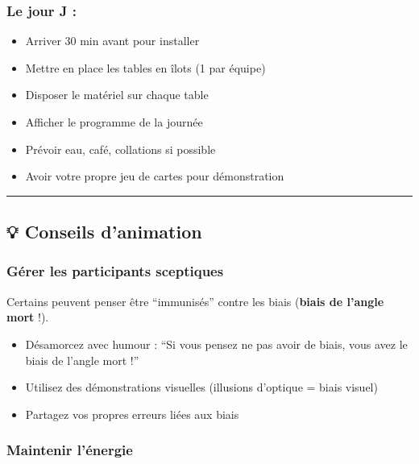 \documentclass[
]{article}
\providecommand{\tightlist}{%
  \setlength{\itemsep}{0pt}\setlength{\parskip}{0pt}}
\begin{document}
\subsubsection{\texorpdfstring{\textbf{Le jour J
:}}{Le jour J :}}\label{le-jour-j}

\begin{itemize}
\tightlist
\item[$\square$]
  Arriver 30 min avant pour installer
\item[$\square$]
  Mettre en place les tables en îlots (1 par équipe)
\item[$\square$]
  Disposer le matériel sur chaque table
\item[$\square$]
  Afficher le programme de la journée
\item[$\square$]
  Prévoir eau, café, collations si possible
\item[$\square$]
  Avoir votre propre jeu de cartes pour démonstration
\end{itemize}

\begin{center}\rule{0.5\linewidth}{0.5pt}\end{center}

\subsection{💡 Conseils d'animation}\label{conseils-danimation}

\subsubsection{\texorpdfstring{\textbf{Gérer les participants
sceptiques}}{Gérer les participants sceptiques}}\label{guxe9rer-les-participants-sceptiques}

Certains peuvent penser être ``immunisés'' contre les biais
(\textbf{biais de l'angle mort} !).

\begin{itemize}
\tightlist
\item
  Désamorcez avec humour : ``Si vous pensez ne pas avoir de biais, vous
  avez le biais de l'angle mort !''
\item
  Utilisez des démonstrations visuelles (illusions d'optique = biais
  visuel)
\item
  Partagez vos propres erreurs liées aux biais
\end{itemize}

\subsubsection{\texorpdfstring{\textbf{Maintenir
l'énergie}}{Maintenir l'énergie}}\label{maintenir-luxe9nergie}
\end{document}
